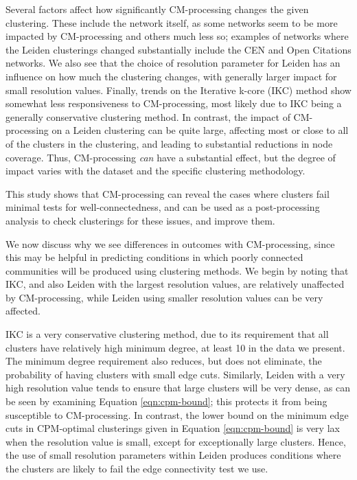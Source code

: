 \documentclass[11pt]{article}   	%
\begin{document}
Several factors affect how significantly  CM-processing changes the given clustering.  These include the network itself, as some networks seem to be more impacted by CM-processing and others much less so; examples of networks where the Leiden clusterings changed substantially include the CEN and Open Citations networks. We also see that the choice of  resolution parameter for Leiden has an influence on how much the clustering changes, with generally larger impact for small resolution values.  Finally, trends on the Iterative k-core (IKC) method show somewhat less responsiveness to CM-processing, most likely due to IKC being a generally conservative clustering method.  In contrast, the impact of CM-processing on a Leiden clustering can be quite large, affecting most or close to all of the clusters in the clustering, and leading  to substantial reductions in node coverage. Thus, CM-processing {\em can} have a substantial effect, but the degree of impact varies with the dataset and the specific clustering methodology.

This study shows that  CM-processing can reveal the cases where clusters fail minimal tests for well-connectedness, and can be used as a post-processing analysis to check clusterings for these issues, and improve them.

We now discuss why we see differences in outcomes with CM-processing, since this may be helpful in predicting conditions in which poorly connected communities will be produced using clustering methods.
We begin by noting that IKC, and also Leiden with the largest resolution values, are relatively unaffected by CM-processing, while Leiden using smaller resolution values can be very affected.

IKC is a very conservative clustering method, due to its requirement that all clusters have relatively high minimum degree, at least 10 in the data we present. The minimum degree requirement also reduces, but does not eliminate, the probability of having clusters with small edge cuts. Similarly, Leiden with a very high resolution value tends to ensure that large clusters will be very dense, as can be seen by examining Equation \ref{eqn:cpm-bound}; this   protects it from being susceptible to CM-processing.  In contrast, the lower bound on the minimum edge cuts in CPM-optimal clusterings given in Equation \ref{eqn:cpm-bound} is very lax when the resolution value is small, except for exceptionally large clusters. 
Hence, the use of small resolution parameters within Leiden produces conditions where the clusters are likely to fail the edge connectivity test we use.
\end{document}
